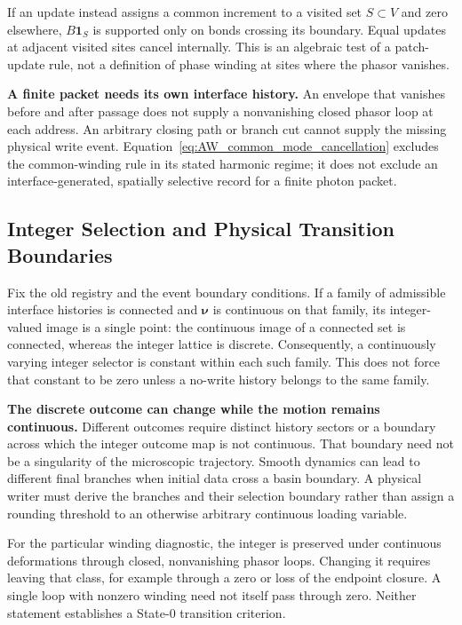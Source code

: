 If an update instead assigns a common increment to a visited set $S\subset V$ and zero elsewhere, $B\mathbf 1_S$ is supported only on bonds crossing its boundary. Equal updates at adjacent visited sites cancel internally. This is an algebraic test of a patch-update rule, not a definition of phase winding at sites where the phasor vanishes.

\medskip
\noindent\textbf{A finite packet needs its own interface history.}
An envelope that vanishes before and after passage does not supply a nonvanishing closed phasor loop at each address. An arbitrary closing path or branch cut cannot supply the missing physical write event. Equation~\eqref{eq:AW_common_mode_cancellation} excludes the common-winding rule in its stated harmonic regime; it does not exclude an interface-generated, spatially selective record for a finite photon packet.

\subsection{Integer Selection and Physical Transition Boundaries}
\label{sec:AW_discrete_selection_test}

Fix the old registry and the event boundary conditions. If a family of admissible interface histories is connected and $\boldsymbol{\nu}$ is continuous on that family, its integer-valued image is a single point: the continuous image of a connected set is connected, whereas the integer lattice is discrete. Consequently, a continuously varying integer selector is constant within each such family. This does not force that constant to be zero unless a no-write history belongs to the same family.

\noindent\textbf{The discrete outcome can change while the motion remains continuous.}
Different outcomes require distinct history sectors or a boundary across which the integer outcome map is not continuous. That boundary need not be a singularity of the microscopic trajectory. Smooth dynamics can lead to different final branches when initial data cross a basin boundary. A physical writer must derive the branches and their selection boundary rather than assign a rounding threshold to an otherwise arbitrary continuous loading variable.

For the particular winding diagnostic, the integer is preserved under continuous deformations through closed, nonvanishing phasor loops. Changing it requires leaving that class, for example through a zero or loss of the endpoint closure. A single loop with nonzero winding need not itself pass through zero. Neither statement establishes a State-0 transition criterion.


